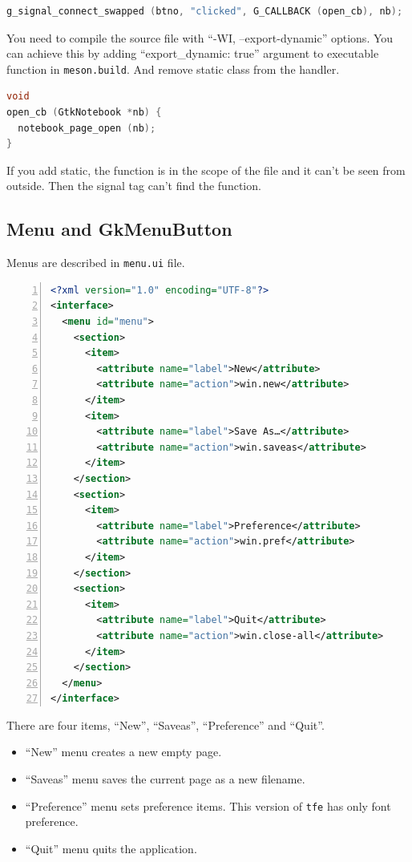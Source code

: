 \begin{lstlisting}[language=C]
g_signal_connect_swapped (btno, "clicked", G_CALLBACK (open_cb), nb);
\end{lstlisting}

You need to compile the source file with ``-WI, --export-dynamic''
options. You can achieve this by adding ``export\_dynamic: true''
argument to executable function in
\passthrough{\lstinline!meson.build!}. And remove static class from the
handler.

\begin{lstlisting}[language=C]
void
open_cb (GtkNotebook *nb) {
  notebook_page_open (nb);
}
\end{lstlisting}

If you add static, the function is in the scope of the file and it can't
be seen from outside. Then the signal tag can't find the function.

\hypertarget{menu-and-gkmenubutton}{%
\subsection{Menu and GkMenuButton}\label{menu-and-gkmenubutton}}

Menus are described in \passthrough{\lstinline!menu.ui!} file.

\begin{lstlisting}[language=XML, numbers=left]
<?xml version="1.0" encoding="UTF-8"?>
<interface>
  <menu id="menu">
    <section>
      <item>
        <attribute name="label">New</attribute>
        <attribute name="action">win.new</attribute>
      </item>
      <item>
        <attribute name="label">Save As…</attribute>
        <attribute name="action">win.saveas</attribute>
      </item>
    </section>
    <section>
      <item>
        <attribute name="label">Preference</attribute>
        <attribute name="action">win.pref</attribute>
      </item>
    </section>
    <section>
      <item>
        <attribute name="label">Quit</attribute>
        <attribute name="action">win.close-all</attribute>
      </item>
    </section>
  </menu>
</interface>
\end{lstlisting}

There are four items, ``New'', ``Saveas'', ``Preference'' and ``Quit''.

\begin{itemize}
\tightlist
\item
  ``New'' menu creates a new empty page.
\item
  ``Saveas'' menu saves the current page as a new filename.
\item
  ``Preference'' menu sets preference items. This version of
  \passthrough{\lstinline!tfe!} has only font preference.
\item
  ``Quit'' menu quits the application.
\end{itemize}

